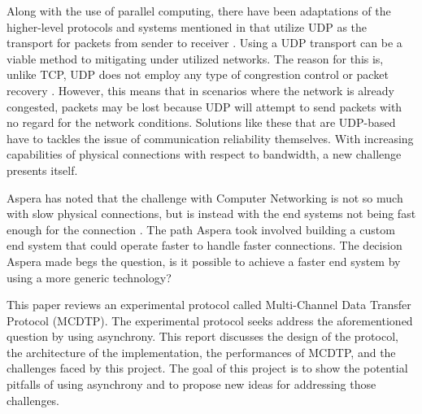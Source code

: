 Along with the use of parallel computing, there have been adaptations of the higher-level protocols and systems mentioned in \cite{Fan2010} that utilize UDP as the transport for packets from sender to receiver \cite{He2002}\cite{Fan2010}\cite{Aspera2016}\cite{Meiss2007}\cite{gu2007udt}. Using a UDP transport can be a viable method to mitigating under utilized networks. The reason for this is, unlike TCP, UDP does not employ any type of congrestion control or packet recovery \cite{postel1980user}. However, this means that in scenarios where the network is already congested, packets may be lost because UDP will attempt to send packets with no regard for the network conditions. Solutions like these that are UDP-based have to tackles the issue of communication reliability themselves. With increasing capabilities of physical connections with respect to bandwidth, a new challenge presents itself.

Aspera has noted that the challenge with Computer Networking is not so much with slow physical connections, but is instead with the end systems not being fast enough for the connection \cite{Aspera2016}\cite{Fan2010}. The path Aspera took involved building a custom end system that could operate faster to handle faster connections. The decision Aspera made begs the question, is it possible to achieve a faster end system by using a more generic technology?

This paper reviews an experimental protocol called Multi-Channel Data Transfer Protocol (MCDTP). The experimental protocol seeks address the aforementioned question by using asynchrony. This report discusses the design of the protocol, the architecture of the implementation, the performances of MCDTP, and the challenges faced by this project. The goal of this project is to show the potential pitfalls of using asynchrony and to propose new ideas for addressing those challenges.
